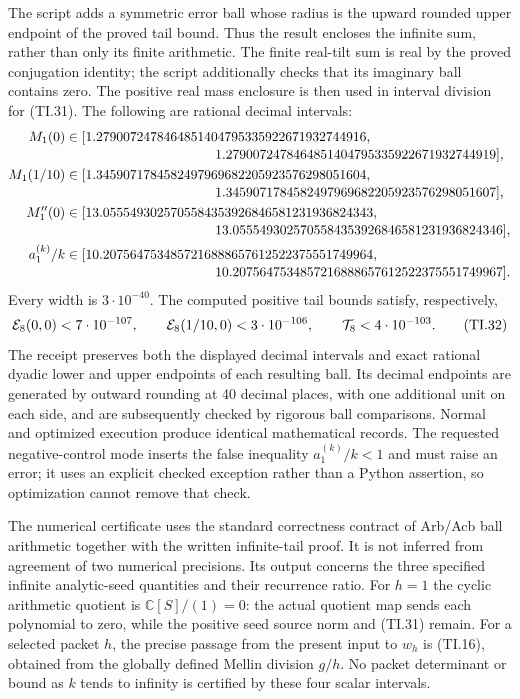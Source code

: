 \documentclass[11pt]{article}
\begin{document}
The script adds a symmetric error ball whose radius is the upward
rounded upper endpoint of the proved tail bound. Thus the result
encloses the infinite sum, rather than only its finite arithmetic.
The finite real-tilt sum is real by the proved conjugation identity;
the script additionally checks that its imaginary ball contains zero.
The positive real mass enclosure is then used in interval division
for (TI.31). The following are rational decimal intervals:
\begin{align*}
 M_1(0)&\in[
 1.2790072478464851404795335922671932744916,\\[-2pt]
 &\hspace{39mm}1.2790072478464851404795335922671932744919],\\
 M_1(1/10)&\in[
 1.3459071784582497969682205923576298051604,\\[-2pt]
 &\hspace{39mm}1.3459071784582497969682205923576298051607],\\
 M_1''(0)&\in[
 13.0555493025705584353926846581231936824343,\\[-2pt]
 &\hspace{39mm}13.0555493025705584353926846581231936824346],\\
 a_1^{(k)}/k&\in[
 10.2075647534857216888657612522375551749964,\\[-2pt]
 &\hspace{39mm}10.2075647534857216888657612522375551749967].
\end{align*}
Every width is $3\cdot10^{-40}$. The computed positive tail bounds
satisfy, respectively,
\begin{equation}
 {\cal E}_8(0,0)<7\cdot10^{-107},\qquad
 {\cal E}_8(1/10,0)<3\cdot10^{-106},\qquad
 {\cal T}_8<4\cdot10^{-103}. \tag{TI.32}
\end{equation}
The receipt preserves both the displayed decimal intervals and exact
rational dyadic lower and upper endpoints of each resulting ball.
Its decimal endpoints are generated by outward rounding at 40 decimal
places, with one additional unit on each side, and are subsequently
checked by rigorous ball comparisons. Normal and optimized execution
produce identical mathematical records. The requested negative-control
mode inserts the false inequality $a_1^{(k)}/k<1$ and must raise an
error; it uses an explicit checked exception rather than a Python
assertion, so optimization cannot remove that check.

The numerical certificate uses the standard correctness contract of
Arb/Acb ball arithmetic together with the written infinite-tail proof.
It is not inferred from agreement of two numerical precisions. Its
output concerns the three specified infinite analytic-seed quantities
and their recurrence ratio. For $h=1$ the cyclic arithmetic quotient
is $\mathbb C[S]/(1)=0$: the actual quotient map sends each polynomial
to zero, while the positive seed source norm and (TI.31) remain.
For a selected packet $h$, the precise passage from the present input
to $w_h$ is (TI.16), obtained from the globally defined Mellin division
$g/h$. No packet determinant or bound as $k$ tends to infinity is
certified by these four scalar intervals.
\end{document}
